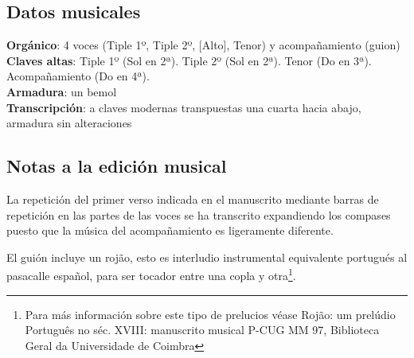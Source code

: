 
\subsection*{Datos musicales}
\noindent \textbf{Orgánico}: 4 voces (Tiple 1º, Tiple 2º, [Alto], Tenor) y acompañamiento (guion)\\
\textbf{Claves altas}: Tiple 1º (Sol en 2ª). Tiple 2º (Sol en 2ª). Tenor (Do en 3ª). Acompañamiento (Do en 4ª).\\
\textbf{Armadura}: un bemol\\
\textbf{Transcripción}: a claves modernas transpuestas una cuarta hacia abajo, armadura sin alteraciones

\subsection*{Notas a la edición musical}

\noindent La repetición del primer verso indicada en el manuscrito mediante barras de repetición en las partes de las voces se ha transcrito expandiendo los compases puesto que la música del acompañamiento es ligeramente diferente.


\noindent El guión incluye un rojão, esto es interludio instrumental equivalente portugués al pasacalle español, para ser tocador entre una copla y otra\footnote{Para más información sobre este tipo de prelucios véase Rojão: um prelúdio Português no séc. XVIII: manuscrito musical P-CUG MM 97, Biblioteca Geral da Universidade de Coimbra}.


